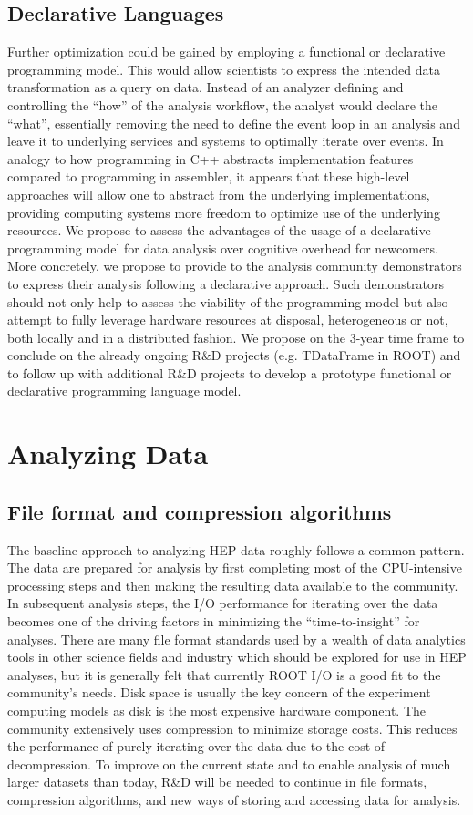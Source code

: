 \documentclass[12pt,a4paper]{article}
\begin{document}
\subsection{Declarative Languages} 
Further optimization could be gained by employing a functional or declarative programming model. This would allow scientists to express the intended data transformation as a query on data. Instead of an analyzer defining and controlling the ``how'' of the analysis workflow, the analyst would declare the ``what'', essentially removing the need to define the event loop in an analysis and leave it to underlying services and systems to optimally iterate over events. In analogy to how programming in C++ abstracts implementation features compared to programming in assembler, it appears that these high-level approaches will allow one to abstract from the underlying implementations, providing computing systems more freedom to optimize use of the underlying resources. We propose to assess the advantages of the usage of a declarative programming model for data analysis over cognitive overhead for newcomers. More concretely, we propose to provide to the analysis community demonstrators to express their analysis following a declarative approach. Such demonstrators should not only help to assess the viability of the programming model but also attempt to fully leverage hardware resources at disposal, heterogeneous or not, both locally and in a distributed fashion. We propose on the 3-year time frame to conclude on the already ongoing R\&D projects (e.g. TDataFrame in ROOT) and to follow up with additional R\&D projects to develop a prototype functional or declarative programming language model. 

\section{Analyzing Data}

\subsection{File format and compression algorithms} 
The baseline approach to analyzing HEP data roughly follows a common pattern. The data are prepared for analysis by first completing most of the CPU-intensive processing steps and then making the resulting data available to the community. In subsequent analysis steps, the I/O performance for iterating over the data becomes one of the driving factors in minimizing the ``time-to-insight'' for analyses. There are many file format standards used by a wealth of data analytics tools in other science fields and industry which should be explored for use in HEP analyses, but it is generally felt that currently ROOT I/O is a good fit to the community's needs. Disk space is usually the key concern of the experiment computing models as disk is the most expensive hardware component. The community extensively uses compression to minimize storage costs. This reduces the performance of purely iterating over the data due to the cost of decompression. To improve on the current state and to enable analysis of much larger datasets than today, R\&D will be needed to continue in file formats, compression algorithms, and new ways of storing and accessing data for analysis. 
\end{document}
